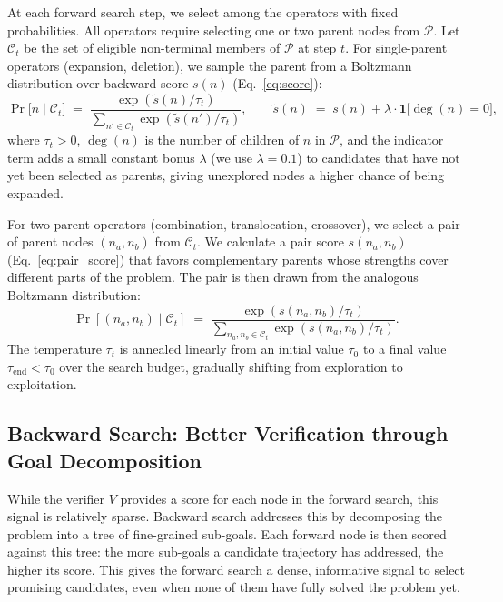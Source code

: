 At each forward search step, we select among the operators with fixed
probabilities. All operators require selecting one or two parent nodes from
$\mathcal{P}$. Let $\mathcal{C}_t$ be the set of eligible non-terminal members of
$\mathcal{P}$ at step $t$. For single-parent operators (expansion, deletion), we sample the parent from a Boltzmann distribution over backward score $s(n)$ (Eq.~\ref{eq:score}):
\begin{equation}
  \Pr\bigl[n\mid\mathcal{C}_t\bigr]
    \;=\;\frac{\exp(\tilde{s}(n)/\tau_t)}
              {\sum_{n'\in\mathcal{C}_t}\exp(\tilde{s}(n')/\tau_t)},
  \qquad
  \tilde{s}(n) \;=\; s(n) + \lambda\cdot\mathbf{1}\!\bigl[\deg(n)=0\bigr],
  \label{eq:boltz}
\end{equation}
where $\tau_t>0$, $\deg(n)$ is the number of children of $n$ in
$\mathcal{P}$, and the indicator term adds a small constant bonus
$\lambda$ (we use $\lambda=0.1$) to candidates that have not yet been
selected as parents, giving unexplored nodes a higher chance of being expanded.

For two-parent operators (combination, translocation, crossover), we select a pair of parent nodes $(n_a, n_b)$ from $\mathcal{C}_t$.
We calculate a pair score $s(n_a, n_b)$ (Eq.~\ref{eq:pair_score}) that favors complementary parents whose strengths cover different parts of the problem.
The pair is then drawn from the analogous Boltzmann distribution:
\begin{equation}
  \Pr[(n_a, n_b) \mid \mathcal{C}_t]
   \;=\;\frac{\exp(s(n_a, n_b)/\tau_t)}
              {\sum_{n_a, n_b\in\mathcal{C}_t}\exp(s(n_a, n_b)/\tau_t)}.
        \label{eq:bi_boltz}
\end{equation}
The temperature $\tau_t$ is annealed linearly from an initial value
$\tau_0$ to a final value $\tau_{\mathrm{end}}<\tau_0$ over the search
budget, gradually shifting from exploration to exploitation.

\subsection{Backward Search: Better Verification through Goal Decomposition}
\label{sec:backward}

While the verifier $V$ provides a score for each node in the forward search, this signal is relatively sparse. Backward search addresses this by decomposing
the problem into a tree of fine-grained sub-goals. Each forward
node is then scored against this tree: the more sub-goals a
candidate trajectory has addressed, the higher its score.
This gives the forward search a dense, informative signal to
select promising candidates, even when none of them have fully
solved the problem yet. 

